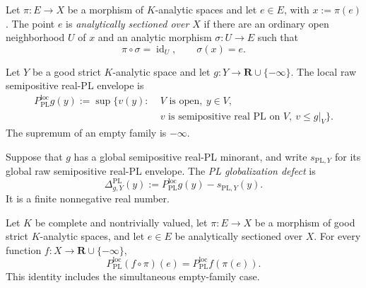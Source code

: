
\begin{definition}
\label{def:p031-analytically-sectioned-point}
Let $\pi:E\to X$ be a morphism of $K$-analytic spaces and let $e\in E$,
with $x:=\pi(e)$.  The point $e$ is \emph{analytically sectioned over
$X$} if there are an ordinary open neighborhood $U$ of $x$ and an analytic
morphism $\sigma:U\to E$ such that
\begin{equation}
\label{eq:p031-local-analytic-section}
        \pi\circ\sigma=\operatorname{id}_U,
        \qquad
        \sigma(x)=e.
\end{equation}
\end{definition}

\begin{definition}
\label{def:p031-local-pl-globalization-defect}
Let $Y$ be a good strict $K$-analytic space and let
$g:Y\to\mathbf R\cup\{-\infty\}$.  The local raw semipositive real-PL
envelope is
\begin{equation}
\label{eq:p031-local-pl-envelope}
 \begin{aligned}
 P_{\mathrm{PL}}^{\mathrm{loc}}g(y)
  :=\sup\{v(y):\;&V\text{ is open},\ y\in V,\\
                 &v\text{ is semipositive real PL on }V,
                   \ v\leq g|_V\}.
 \end{aligned}
\end{equation}
The supremum of an empty family is $-\infty$.

Suppose that $g$ has a global semipositive real-PL minorant, and write
$s_{\mathrm{PL},Y}$ for its global raw semipositive real-PL envelope.  The
\emph{PL globalization defect} is
\begin{equation}
\label{eq:p031-pl-globalization-defect}
 \Delta^{\mathrm{PL}}_{g,Y}(y)
   :=P_{\mathrm{PL}}^{\mathrm{loc}}g(y)-s_{\mathrm{PL},Y}(y).
\end{equation}
It is a finite nonnegative real number.
\end{definition}

\begin{theorem}
\label{thm:p031-sectioned-local-pl-pullback}
Let $K$ be complete and nontrivially valued, let $\pi:E\to X$ be a
morphism of good strict $K$-analytic spaces, and let $e\in E$ be
analytically sectioned over $X$.  For every function
$f:X\to\mathbf R\cup\{-\infty\}$,
\begin{equation}
\label{eq:p031-sectioned-local-pl-pullback}
 P_{\mathrm{PL}}^{\mathrm{loc}}(f\circ\pi)(e)
    =P_{\mathrm{PL}}^{\mathrm{loc}}f(\pi(e)).
\end{equation}
This identity includes the simultaneous empty-family case.
\end{theorem}

